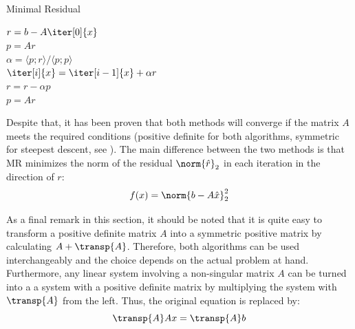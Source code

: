 \begin{algorithm}[h]
  \caption{Minimal Residual}
  \label{alg:mr}
  \SetAlgoLined
  \DontPrintSemicolon
  $r = b-A\iter[0]{x}$ \\
  $p = Ar$ \\
   {
    $\alpha = \langle p;r \rangle / \langle p;p \rangle$ \\
    $\iter[i]{x} = \iter[i-1]{x}+\alpha r$ \\
    $r = r - \alpha p$ \\
    $p = Ar$ \\
  }
\end{algorithm}

Despite that, it has been proven that both methods will converge if the matrix $A$ meets the required conditions (positive definite for both algorithms, symmetric for steepest descent, see \cite{saad_iterative_2003}). The main difference between the two methods is that MR minimizes the norm of the residual $\norm{\hat{r}}_2$ in each iteration in the direction of $r$:
\begin{equation}
    f(x) = \norm{b-A\hat{x}}_2^2    
\end{equation}

\noindent As a final remark in this section, it should be noted that it is quite easy to transform a positive definite matrix $A$ into a symmetric positive matrix by calculating $A+\transp{A}$. Therefore, both algorithms can be used interchangeably and the choice depends on the actual problem at hand. Furthermore, any linear system involving a non-singular matrix $A$ can be turned into a a system with a positive definite matrix by multiplying the system with $\transp{A}$ from the left. Thus, the original equation is replaced by:
\begin{equation}
    \transp{A}Ax = \transp{A}b
\end{equation}

